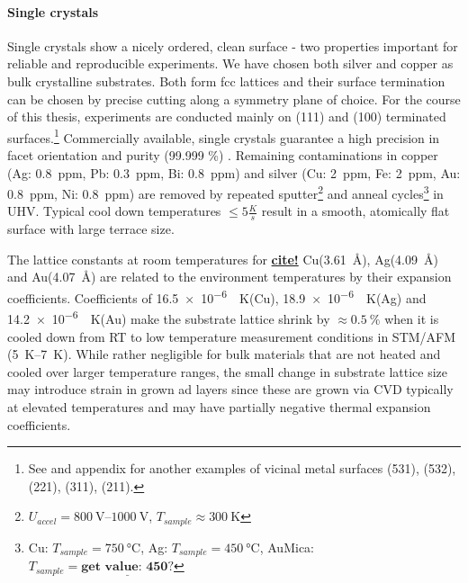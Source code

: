 \paragraph{Single crystals}
Single crystals show a nicely ordered, clean surface - two properties important for reliable and reproducible experiments. We have chosen both silver and copper as bulk crystalline substrates. Both form fcc lattices and their surface termination can be chosen by precise cutting along a symmetry plane of choice. For the course of this thesis, experiments are conducted mainly on (111) and (100) terminated surfaces.\footnote{See \cite{riemann_ionic_2002} and appendix  for another examples of vicinal metal surfaces (531), (532), (221), (311), (211).} Commercially available, single crystals guarantee a high precision in facet orientation and purity (99.999 \%) \cite{mateck}. Remaining contaminations in copper (Ag: \SI{0.8}{ppm}, Pb: \SI{0.3}{ppm}, Bi: \SI{0.8}{ppm}) and silver (Cu: \SI{2}{ppm}, Fe: \SI{2}{ppm}, Au: \SI{0.8}{ppm}, Ni: \SI{0.8}{ppm}) are removed by repeated sputter\footnote{$U_{accel}=\SIrange{800}{1000}{\volt}$, $T_{sample}\approx \SI{300}{\kelvin}$} and anneal cycles\footnote{Cu: $T_{sample}=\SI{750}{\celsius}$, Ag: $T_{sample}=\SI{450}{\celsius}$, Au\/Mica: $T_{sample}= \underline{\textbf{get value: 450?}}$} in UHV. Typical cool down temperatures $\leq 5 \frac{K}{s}$ result in a smooth, atomically flat surface with large terrace size. 

The lattice constants at room temperatures for \underline{\textbf{cite!}} Cu(\SI{3,61}{\angstrom}), Ag(\SI{4,09}{\angstrom}) and Au(\SI{4,07}{\angstrom}) are related to the environment temperatures by their expansion coefficients.
Coefficients of \SI{16,5e-6}{\per \kelvin}(Cu), \SI{18,9e-6}{\per \kelvin}(Ag) and \SI{14,2e-6}{\per \kelvin}(Au) make the substrate lattice shrink by $\approx \SI{0,5}{\percent}$ when it is cooled down from RT to low temperature measurement conditions in STM/AFM (\SIrange{5}{7}{\kelvin}). While rather negligible for bulk materials that are not heated and cooled over larger temperature ranges, the small change in substrate lattice size may introduce strain in grown ad layers since these are grown via CVD typically at elevated temperatures and may have partially negative thermal expansion coefficients\cite{farwick_zum_hagen_structure_2016}.

